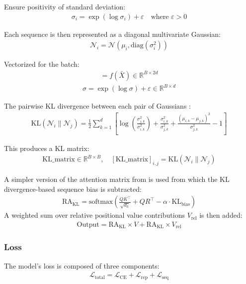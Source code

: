 \documentclass{article}
\begin{document}
Ensure positivity of standard deviation:
\begin{align}
\sigma_i = \exp(\log \sigma_i) + \varepsilon
\quad \text{where } \varepsilon > 0
\end{align}

Each sequence is then represented as a diagonal multivariate Gaussian:
\begin{align}
\mathcal{N}_i = \mathcal{N}(\mu_i, \mathrm{diag}(\sigma_i^2))
\end{align}

Vectorized for the batch:
\begin{align}
[\mu, \log \sigma] = f(\bar{X}) \in \mathbb{R}^{B \times 2d}
\end{align}
\begin{align}
\sigma = \exp(\log \sigma) + \varepsilon \in \mathbb{R}^{B \times d}
\end{align}

The pairwise KL divergence between each pair of Gaussians \cite{kldiv}:
\begin{align}
\label{eq:kldiv}
\text{KL}(\mathcal{N}_i \parallel \mathcal{N}_j) =
\frac{1}{2} \sum_{k=1}^{d} \left[
\log\left( \frac{\sigma_{j,k}^2}{\sigma_{i,k}^2} \right) +
\frac{\sigma_{i,k}^2}{\sigma_{j,k}^2} +
\frac{(\mu_{i,k} - \mu_{j,k})^2}{\sigma_{j,k}^2} - 1
\right]
\end{align}

This produces a KL matrix:
\begin{align}
\text{KL\_matrix} \in \mathbb{R}^{B \times B}, \quad
[\text{KL\_matrix}]_{i,j} = \text{KL}(\mathcal{N}_i \parallel \mathcal{N}_j)
\end{align}

A simpler version of the attention matrix from \cite{XL} is used from which the KL divergence-based sequence bias is subtracted:
\begin{align}
\text{RA}_{\text{KL}} = \text{softmax} \left( \frac{Q K^\top}{\sqrt{d_k}} + Q R^\top - \alpha \cdot \text{KL}_{\text{bias}} \right)
\end{align}
A weighted sum over relative positional value contributions $V_{\text{rel}}$ is then added:
\begin{align}
\text{Output} = \text{RA}_{\text{KL}} \times V + \text{RA}_{\text{KL}} \times V_{\text{rel}}
\end{align}

\subsubsection{Loss}
The model's loss is composed of three components:
\begin{align}
\mathcal{L}_{\text{total}} = \mathcal{L}_{\text{CE}} + \mathcal{L}_{\text{rep}} + \mathcal{L}_{\text{seq}}
\end{align}
\end{document}
